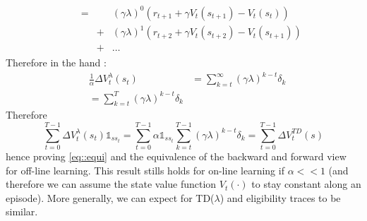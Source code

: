 \documentclass[a4paper]{article}
\newcommand\tdl{TD($\lambda$)}
\begin{document}
{$$\begin{aligned}
										&\begin{aligned}
											&= &&(\gamma \lambda)^0(r_{t+1} + \gamma V_t(s_{t+1}) - V_t(s_t)) \\ 
											&&+ &(\gamma\lambda)^1(r_{t+2} + \gamma V_t(s_{t+2}) - V_t(s_{t+1})) \\
											&&+ &\hdots 
										\end{aligned}
			\end{aligned}
		$$
		Therefore in the hand : 
		\begin{equation}
			\begin{aligned}
			&\frac{1}{\alpha}\Delta V_t^\lambda(s_t) &= \sum_{k=t}^\infty (\gamma\lambda)^{k-t} \delta_k \\
							& = \sum_{k=t}^T (\gamma\lambda)^{k-t} \delta_k
			\end{aligned}
		\end{equation}
		Therefore 
		\begin{equation}
			\sum_{t=0}^{T-1} \Delta V_t^\lambda(s_t)\mathds{1}_{ss_t} = \sum_{t=0}^{T-1}\alpha \mathds{1}_{ss_t} \sum_{k=t}^{T-1} (\gamma \lambda)^{k-t}\delta_k = \sum_{t=0}^{T-1} \Delta V_t^{TD}(s) 
		\end{equation}
		hence proving \eqref{eq::equi} and the equivalence of the backward and forward view for off-line learning. This result stills holds for on-line learning if $\alpha << 1$ (and therefore we can assume the state value function $V_t(\cdot)$ to stay constant along an episode). More generally, we can expect for \tdl{} and eligibility traces to be similar. 
		
	}
\end{document}
